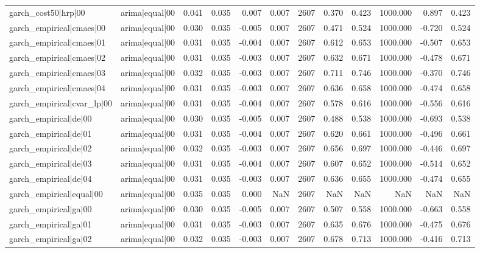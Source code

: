 \begin{table}
\begin{tabular}{llrrrrrrrrrr}
garch\_cost50|hrp|00 & arima|equal|00 & 0.041 & 0.035 & 0.007 & 0.007 & 2607 & 0.370 & 0.423 & 1000.000 & 0.897 & 0.423 \\
garch\_empirical|cmaes|00 & arima|equal|00 & 0.030 & 0.035 & -0.005 & 0.007 & 2607 & 0.471 & 0.524 & 1000.000 & -0.720 & 0.524 \\
garch\_empirical|cmaes|01 & arima|equal|00 & 0.031 & 0.035 & -0.004 & 0.007 & 2607 & 0.612 & 0.653 & 1000.000 & -0.507 & 0.653 \\
garch\_empirical|cmaes|02 & arima|equal|00 & 0.031 & 0.035 & -0.003 & 0.007 & 2607 & 0.632 & 0.671 & 1000.000 & -0.478 & 0.671 \\
garch\_empirical|cmaes|03 & arima|equal|00 & 0.032 & 0.035 & -0.003 & 0.007 & 2607 & 0.711 & 0.746 & 1000.000 & -0.370 & 0.746 \\
garch\_empirical|cmaes|04 & arima|equal|00 & 0.031 & 0.035 & -0.003 & 0.007 & 2607 & 0.636 & 0.658 & 1000.000 & -0.474 & 0.658 \\
garch\_empirical|cvar\_lp|00 & arima|equal|00 & 0.031 & 0.035 & -0.004 & 0.007 & 2607 & 0.578 & 0.616 & 1000.000 & -0.556 & 0.616 \\
garch\_empirical|de|00 & arima|equal|00 & 0.030 & 0.035 & -0.005 & 0.007 & 2607 & 0.488 & 0.538 & 1000.000 & -0.693 & 0.538 \\
garch\_empirical|de|01 & arima|equal|00 & 0.031 & 0.035 & -0.004 & 0.007 & 2607 & 0.620 & 0.661 & 1000.000 & -0.496 & 0.661 \\
garch\_empirical|de|02 & arima|equal|00 & 0.032 & 0.035 & -0.003 & 0.007 & 2607 & 0.656 & 0.697 & 1000.000 & -0.446 & 0.697 \\
garch\_empirical|de|03 & arima|equal|00 & 0.031 & 0.035 & -0.004 & 0.007 & 2607 & 0.607 & 0.652 & 1000.000 & -0.514 & 0.652 \\
garch\_empirical|de|04 & arima|equal|00 & 0.031 & 0.035 & -0.003 & 0.007 & 2607 & 0.636 & 0.655 & 1000.000 & -0.474 & 0.655 \\
garch\_empirical|equal|00 & arima|equal|00 & 0.035 & 0.035 & 0.000 & NaN & 2607 & NaN & NaN & NaN & NaN & NaN \\
garch\_empirical|ga|00 & arima|equal|00 & 0.030 & 0.035 & -0.005 & 0.007 & 2607 & 0.507 & 0.558 & 1000.000 & -0.663 & 0.558 \\
garch\_empirical|ga|01 & arima|equal|00 & 0.031 & 0.035 & -0.003 & 0.007 & 2607 & 0.635 & 0.676 & 1000.000 & -0.475 & 0.676 \\
garch\_empirical|ga|02 & arima|equal|00 & 0.032 & 0.035 & -0.003 & 0.007 & 2607 & 0.678 & 0.713 & 1000.000 & -0.416 & 0.713 \\

\end{tabular}
\end{table}
